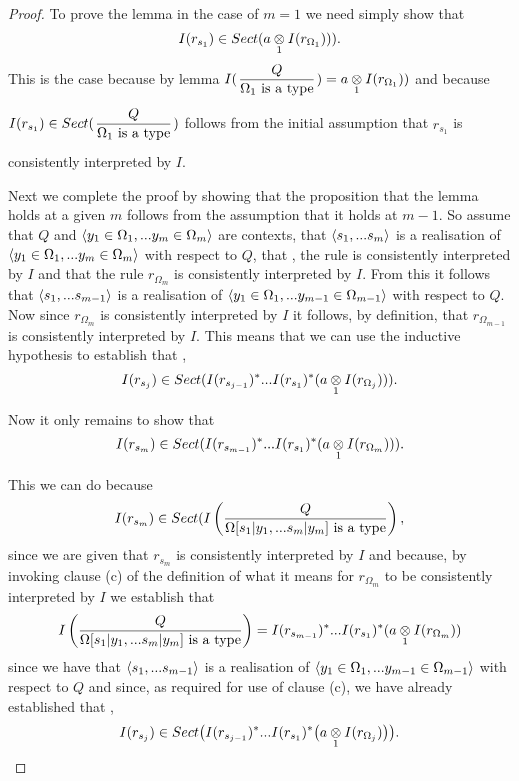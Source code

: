 \begin{proof}
To prove the lemma in the case of $m=1$ we need simply show that 
 $$I(r_{s_1}) \in Sect(\crossx{a}{I(r_{\Omega_1})}{1})).$$
 This is the case because by lemma  $I(\gatdisplayrule{Q}{\isT{\Omega_1}}) = \crossx{a}{I(r_{\Omega_1})}{1})$
 and because $I(r_{s_1}) \in Sect(\gatdisplayrule{Q}{\isT{\Omega_1}})$ follows from the initial assumption that $r_{s_1}$ is
 consistently interpreted by $I$. 

Next we complete the proof by showing that the proposition that the lemma holds at a given $m$ follows from
the assumption that it holds at $m-1$. So assume that $Q$  and $\encyOmega{m}$ are contexts, 
that $\tuple{\sm}$ is a realisation of $\tuple{\yOmega{m}}$ with respect to $Q$,
that \foreachj, the rule  is consistently interpreted by $I$ 
and that the rule $r_{\Omega_m}$ is consistently interpreted by $I$. From this it follows
that  $\tuple{\sm[-1]}$ is a realisation of $\tuple{\yOmega{m-1}}$ with respect to $Q$.
Now since $r_{\Omega_m}$ is consistently interpreted by $I$ it follows, by definition,  that $r_{\Omega_{m-1}}$ is consistently interpreted by $I$. This means that we can use the inductive hypothesis to establish that \foreachj[m-1],  
$$I(r_{s_j}) \in Sect(I(r_{s_{j-1}})^*...I(r_{s_1})^*(\crossx{a}{I(r_{\Omega_j})}{1})).$$

Now it only remains to show that
$$I(r_{s_m}) \in Sect(I(r_{s_{m-1}})^*...I(r_{s_1})^*(\crossx{a}{I(r_{\Omega_m})}{1})).$$

This we can do because
$$I(r_{s_m}) \in Sect(\Imappedrule{Q}{\isT{\Omega[\SUBsFORy{m}]}},$$ since we are given that $r_{s_m}$ is consistently interpreted by $I$
and because, by invoking clause (c) of the definition of what it means for $r_{\Omega_m}$ to be consistently interpreted by $I$
we establish that
 $$\Imappedrule{Q}{\isT{\Omega[\SUBsFORy{m}]}}= I(r_{s_{m-1}})^*...I(r_{s_1})^*(\crossx{a}{I(r_{\Omega_m})}{1})$$
 since we have that $\tuple{\sm[-1]}$ is a realisation of $\tuple{\yOmega{m-1}}$ with respect to $Q$
 and since, as required for use of clause (c), we have already established that \foreachj[m-1],  
$$I(r_{s_j}) \in Sect\big(I(r_{s_{j-1}})^*...I(r_{s_1})^*\big(\crossx{a}{I(r_{\Omega_j})}{1}\big)\big).$$
 \end{proof}

